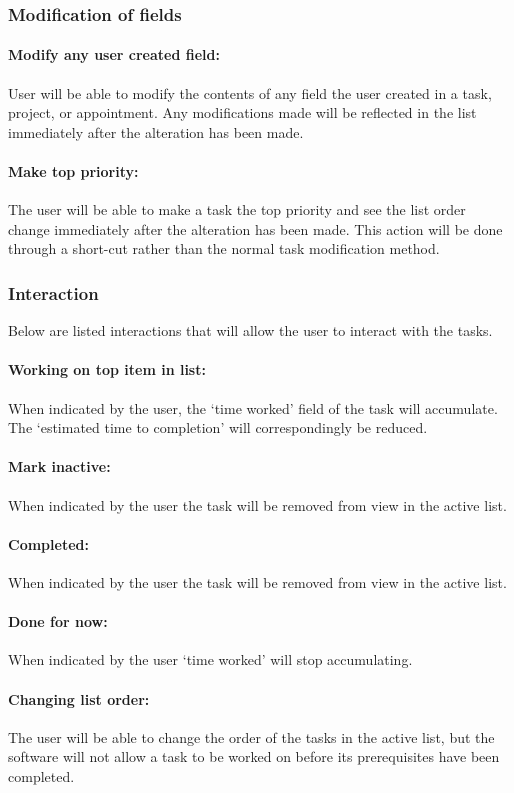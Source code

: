 \documentclass[12pt,a4paper]{article}
\begin{document}
\subsubsection{Modification of fields}
\paragraph{Modify any user created field:} User will be able to modify the contents of any field the user created in a task, project, or appointment.  Any modifications made will be reflected in the list immediately after the alteration has been made.
\paragraph{Make top priority:} The user will be able to make a task the top priority and see the list order change immediately after the alteration has been made.  This action will be done through a short-cut rather than the normal task modification method.

\subsubsection{Interaction}
Below are listed interactions that will allow the user to interact with the tasks.

\paragraph{Working on top item in list:} When indicated by the user, the `time worked' field of the task will accumulate. The `estimated time to completion' will correspondingly be reduced.
\paragraph{Mark inactive:} When indicated by the user the task will be removed from view in the active list.
\paragraph{Completed:} When indicated by the user the task will be removed from view in the active list.
\paragraph{Done for now:} When indicated by the user `time worked' will stop accumulating.
\paragraph{Changing list order:} The user will be able to change the order of the tasks in the active list, but the software will not allow a task to be worked on before its prerequisites have been completed. 
\end{document}
